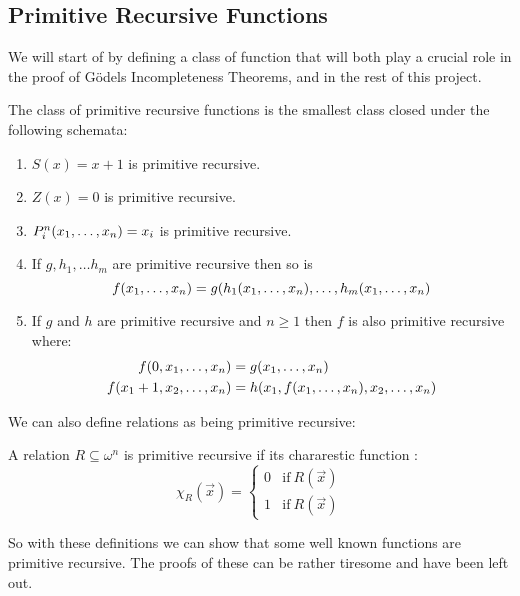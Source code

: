 \documentclass[../main.tex]{subfiles}
\begin{document}
\subsection{Primitive Recursive Functions}
We will start of by defining a class of function that will both play a crucial
role in the proof of Gödels Incompleteness Theorems, and in the rest of this
project. 
\begin{defi}
	The class of primitive recursive functions is the smallest class closed
	under the following schemata:
	\begin{enumerate}[label=\Roman*.]
		\item $S(x)=x+1$ is primitive recursive.
		\item $Z(x)=0$ is primitive recursive.
		\item $P^n_i(x_1,\ldots,x_n)=x_i$ is primitive recursive.
		\item If $g,h_1,\ldots h_m$ are primitive recursive then so
			is
			$$f(x_1,\ldots,x_n)=g(h_1(x_1,\ldots,x_n),\ldots,h_m(x_1,\ldots,x_n)$$
		\item If $g$ and $h$ are primitive recursive and $n\geq 1$ then
			$f$ is also primitive recursive where:
			\begin{align*}
				f(0,x_1,\ldots,x_n)&=g(x_1,\ldots,x_n)\\
				f(x_1+1,x_2,\ldots,x_n)&=h(x_1,f(x_1,\ldots,x_n),x_2,\ldots,x_n)
			\end{align*}
	\end{enumerate}
\end{defi}
We can also define relations as being primitive recursive:
\begin{defi}
	A relation $R\subseteq \omega^n$ is primitive recursive if its
	chararestic function :
	\[\chi_R(\vec{x})=\begin{cases}
		0 &\text{if}\ R(\vec{x})\\
		1 &\text{if}\ R(\vec x)
	\end{cases}\]
\end{defi}
So with these definitions we can show that some well known functions are
primitive recursive. The proofs of these can be rather tiresome and have been
left out.
\newpage
\end{document}
